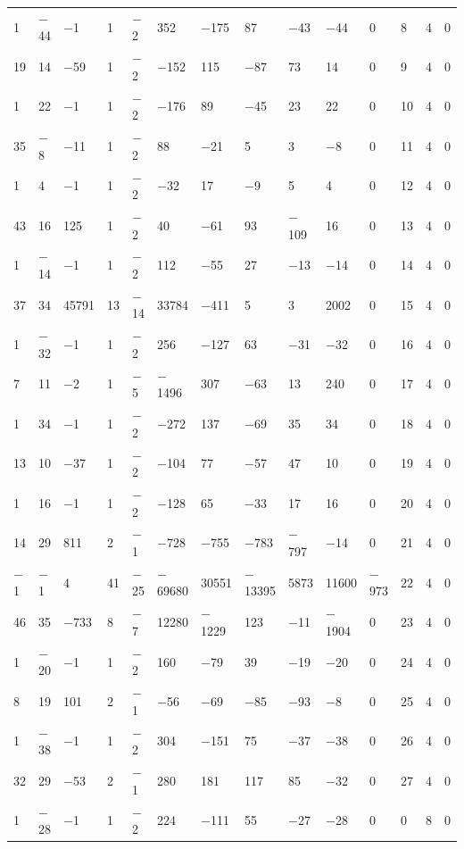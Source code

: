 \documentclass[10pt,a4paper]{amsart}
\numberwithin{equation}{section}
\theoremstyle{definition}
\numberwithin{table}{section}
\begin{document}
{\begin{paracol}{3}
\begin{supertabular}{|w{c}{.32cm}w{c}{.32cm}w{c}{.32cm}@{\hspace{.5cm}}w{c}{.2cm}w{c}{.2cm}|@{\hspace{\tabcolsep}}HHHHHHw{c}{.17cm}w{c}{.17cm}w{c}{.17cm}|}
			1 & $-$44 & $-$1 & 1 & $-$2 & 352 & $-$175 & 87 & $-$43 & $-$44 & 0 & 8 & 4 & 0 \\
			19 & 14 & $-$59 & 1 & $-$2 & $-$152 & 115 & $-$87 & 73 & 14 & 0 & 9 & 4 & 0 \\
			1 & 22 & $-$1 & 1 & $-$2 & $-$176 & 89 & $-$45 & 23 & 22 & 0 & 10 & 4 & 0 \\
			35 & $-$8 & $-$11 & 1 & $-$2 & 88 & $-$21 & 5 & 3 & $-$8 & 0 & 11 & 4 & 0 \\
			1 & 4 & $-$1 & 1 & $-$2 & $-$32 & 17 & $-$9 & 5 & 4 & 0 & 12 & 4 & 0 \\
			43 & 16 & 125 & 1 & $-$2 & 40 & $-$61 & 93 & $-$109 & 16 & 0 & 13 & 4 & 0 \\
			1 & $-$14 & $-$1 & 1 & $-$2 & 112 & $-$55 & 27 & $-$13 & $-$14 & 0 & 14 & 4 & 0 \\
			37 & 34 & 45791 & 13 & $-$14 & 33784 & $-$411 & 5 & 3 & 2002 & 0 & 15 & 4 & 0 \\
			1 & $-$32 & $-$1 & 1 & $-$2 & 256 & $-$127 & 63 & $-$31 & $-$32 & 0 & 16 & 4 & 0 \\
			7 & 11 & $-$2 & 1 & $-$5 & $-$1496 & 307 & $-$63 & 13 & 240 & 0 & 17 & 4 & 0 \\
			1 & 34 & $-$1 & 1 & $-$2 & $-$272 & 137 & $-$69 & 35 & 34 & 0 & 18 & 4 & 0 \\
			13 & 10 & $-$37 & 1 & $-$2 & $-$104 & 77 & $-$57 & 47 & 10 & 0 & 19 & 4 & 0 \\
			1 & 16 & $-$1 & 1 & $-$2 & $-$128 & 65 & $-$33 & 17 & 16 & 0 & 20 & 4 & 0 \\
			14 & 29 & 811 & 2 & $-$1 & $-$728 & $-$755 & $-$783 & $-$797 & $-$14 & 0 & 21 & 4 & 0 \\
			$-$1 & $-$1 & 4 & 41 & $-$25 & $-$69680 & 30551 & $-$13395 & 5873 & 11600 & $-$973 & 22 & 4 & 0 \\
			46 & 35 & $-$733 & 8 & $-$7 & 12280 & $-$1229 & 123 & $-$11 & $-$1904 & 0 & 23 & 4 & 0 \\
			1 & $-$20 & $-$1 & 1 & $-$2 & 160 & $-$79 & 39 & $-$19 & $-$20 & 0 & 24 & 4 & 0 \\
			8 & 19 & 101 & 2 & $-$1 & $-$56 & $-$69 & $-$85 & $-$93 & $-$8 & 0 & 25 & 4 & 0 \\
			1 & $-$38 & $-$1 & 1 & $-$2 & 304 & $-$151 & 75 & $-$37 & $-$38 & 0 & 26 & 4 & 0 \\
			32 & 29 & $-$53 & 2 & $-$1 & 280 & 181 & 117 & 85 & $-$32 & 0 & 27 & 4 & 0 \\
			1 & $-$28 & $-$1 & 1 & $-$2 & 224 & $-$111 & 55 & $-$27 & $-$28 & 0 & 0 & 8 & 0 \\

\end{supertabular}
\end{paracol}}
\end{document}
